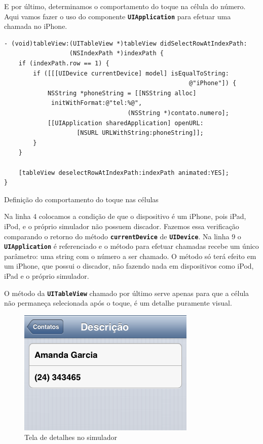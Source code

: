 \documentclass[a4paper,12pt,brazil,doubleside]{book}
\begin{document}
\begin{singlespace}
E por último, determinamos o comportamento do toque na célula do número. Aqui vamos fazer o uso do componente \texttt{\textbf{UIApplication}} para efetuar uma chamada no iPhone.

\begin{listing}[H]
\begin{verbatim}
- (void)tableView:(UITableView *)tableView didSelectRowAtIndexPath:
                  (NSIndexPath *)indexPath {
    if (indexPath.row == 1) {
        if ([[[UIDevice currentDevice] model] isEqualToString:
                                                   @"iPhone"]) {
            NSString *phoneString = [[NSString alloc] 
             initWithFormat:@"tel:%@",
                                  (NSString *)contato.numero];
            [[UIApplication sharedApplication] openURL:
                    [NSURL URLWithString:phoneString]];
        }
    }
    
    [tableView deselectRowAtIndexPath:indexPath animated:YES];
}
\end{verbatim}
\caption{Definição do comportamento do toque nas células}
\end{listing}


Na linha 4 colocamos a condição de que o dispositivo é um iPhone, pois iPad, iPod, e o próprio simulador não possuem discador. Fazemos essa verificação comparando o retorno do método \texttt{\textbf{currentDevice}} de \texttt{\textbf{UIDevice}}. Na linha 9 o \texttt{\textbf{UIApplication}} é referenciado e o método para efetuar chamadas recebe um único parâmetro: uma string com o número a ser chamado. O método só terá efeito em um iPhone, que possui o discador, não fazendo nada em dispositivos como iPod, iPad e o próprio simulador.

O método da \texttt{\textbf{UITableView}} chamado por último serve apenas para que a célula não permaneça selecionada após o toque, é um detalhe puramente visual.

\bigskip
\bigskip

\begin{figure}[H]
  \centering
  \includegraphics[width=.75\textwidth]{figuras/table/table5.png}
  \caption{Tela de detalhes no simulador}
  \label{fig:a}
\end{figure}


\end{singlespace}
\end{document}
